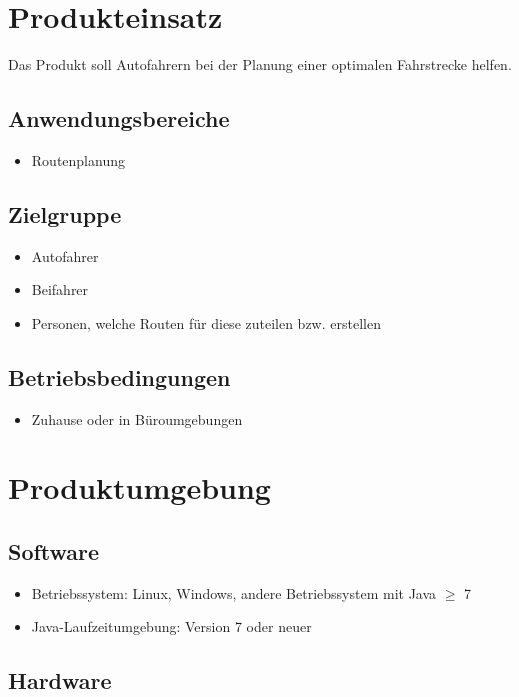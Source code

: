 \documentclass[a4paper, 11pt]{article}
\begin{document}
\section{Produkteinsatz}

Das Produkt soll Autofahrern bei der Planung einer optimalen Fahrstrecke helfen.

\subsection{Anwendungsbereiche}
\begin{itemize}
\item Routenplanung
\end{itemize}

\subsection{Zielgruppe}
\begin{itemize}
\item Autofahrer
\item Beifahrer
\item Personen, welche Routen für diese zuteilen bzw. erstellen
\end{itemize}

\subsection{Betriebsbedingungen}
\begin{itemize}
\item Zuhause oder in Büroumgebungen
\end{itemize}

\section{Produktumgebung}

\subsection{Software}

\begin{itemize}
\item Betriebssystem: Linux, Windows, andere Betriebssystem mit Java $\geq$ 7
\item Java-Laufzeitumgebung: Version 7 oder neuer
\end{itemize}

\subsection{Hardware}
\end{document}
